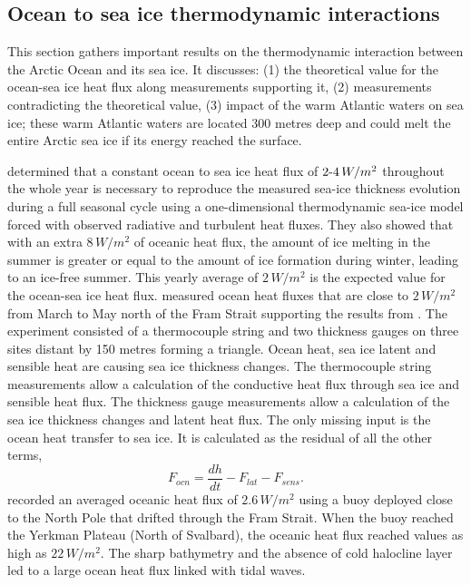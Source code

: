 
\subsection{Ocean to sea ice thermodynamic interactions}\label{OtoIm}

This section gathers important results on the thermodynamic interaction between the Arctic Ocean and its sea ice. It discusses: (1) the theoretical value for the ocean-sea ice heat flux along measurements supporting it, (2) measurements contradicting the theoretical value, (3) impact of the warm Atlantic waters on sea ice; these warm Atlantic waters are located 300 metres deep and could melt the entire Arctic sea ice if its energy reached the surface.

\citet{ISI:A1971I688400007} determined that a constant ocean to sea ice heat flux of $2{\text -}4 \,W/m^2$ throughout the whole year is necessary to reproduce the  measured sea-ice thickness evolution during a full seasonal cycle using a one-dimensional thermodynamic sea-ice model forced with observed radiative and turbulent heat fluxes. They also showed that with an extra $8 \, W/m^2$ of oceanic heat flux, the amount of ice melting in the summer is greater or equal to the amount of ice formation during winter, leading to an ice-free summer. This yearly average of $2 \,W/m^2$ is the expected value for the ocean-sea ice heat flux. \citet{ISI:A1982NF38100017} measured ocean heat fluxes that are close to $2 \, W/m^2$ from March to May north of the Fram Strait supporting the results from \citet{ISI:A1971I688400007}. The experiment consisted of a thermocouple string and two thickness gauges on three sites distant by 150 metres forming a triangle. Ocean heat, sea ice latent and sensible heat are causing sea ice thickness changes. The thermocouple string measurements allow a calculation of the conductive heat flux through sea ice and sensible heat flux. The thickness gauge measurements allow a calculation of the sea ice thickness changes and latent heat flux. The only missing input is the ocean heat transfer to sea ice. It is calculated as the residual of all the other terms, 
\begin{equation}
F_{ocn} = \frac{dh}{dt} - F_{lat}-F_{sens}.
\end{equation}
\citet{GRL:GRL17601} recorded an averaged oceanic heat flux of $2.6 \, W/m^2$ using a buoy deployed close to the North Pole that drifted through the Fram Strait. When the buoy reached the Yerkman Plateau (North of Svalbard), the oceanic heat flux reached values as high as $22 \, W/m^2$. The sharp bathymetry and the absence of cold halocline layer led to a large ocean heat flux linked with tidal waves. 

